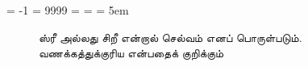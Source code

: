 \documentclass[11pt,openany]{book}
\title{\booktitle}
\author{\tamilfont{இணையதளம்}}
\date{\today}
\begin{document}
\hyphenchar\the\font = -1 %
\pretolerance = 9999 %
\tolerance = \pretolerance %
\hbadness = \pretolerance %
\emergencystretch = 5em %

\frontmatter

\thispagestyle{empty}
\newpage

\thispagestyle{empty}
\copyrightpage
\clearpage

\begin{figure}[p]
  \centering
  \caption{\label{Figure:-tamilfont}\tamilfont ஸ்ரீ அல்லது சிறீ என்றால் செல்வம் எனப் பொருள்படும். வணக்கத்துக்குரிய என்பதைக் குறிக்கும்}
\end{figure}

\clearpage

\tableofcontents

\cleardoublepage

\tamilfont



\mainmatter

%
%



%
%


\end{document}
